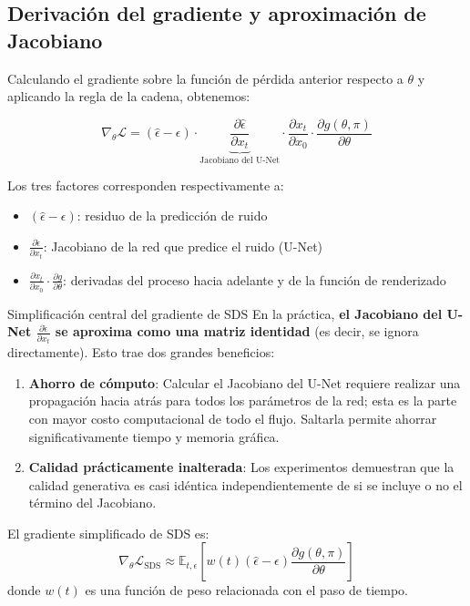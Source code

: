 \subsection{Derivación del gradiente y aproximación de Jacobiano}

Calculando el gradiente sobre la función de pérdida anterior respecto a $\theta$ y aplicando la regla de la cadena, obtenemos:

$$
\nabla_\theta \mathcal{L} = (\hat{\epsilon} - \epsilon) \cdot \underbrace{\frac{\partial \hat{\epsilon}}{\partial x_t}}_{\text{Jacobiano del U-Net}} \cdot \frac{\partial x_t}{\partial x_0} \cdot \frac{\partial g(\theta, \pi)}{\partial \theta}
$$

Los tres factores corresponden respectivamente a:
\begin{itemize}
    \item $(\hat{\epsilon} - \epsilon)$: residuo de la predicción de ruido
    \item $\frac{\partial \hat{\epsilon}}{\partial x_t}$: Jacobiano de la red que predice el ruido (U-Net)
    \item $\frac{\partial x_t}{\partial x_0} \cdot \frac{\partial g}{\partial \theta}$: derivadas del proceso hacia adelante y de la función de renderizado
\end{itemize}

\begin{importantbox}{Simplificación central del gradiente de SDS}
En la práctica, \textbf{el Jacobiano del U-Net $\frac{\partial \hat{\epsilon}}{\partial x_t}$ se aproxima como una matriz identidad} (es decir, se ignora directamente). Esto trae dos grandes beneficios:

\begin{enumerate}
    \item \textbf{Ahorro de cómputo}: Calcular el Jacobiano del U-Net requiere realizar una propagación hacia atrás para todos los parámetros de la red; esta es la parte con mayor costo computacional de todo el flujo. Saltarla permite ahorrar significativamente tiempo y memoria gráfica.
    \item \textbf{Calidad prácticamente inalterada}: Los experimentos demuestran que la calidad generativa es casi idéntica independientemente de si se incluye o no el término del Jacobiano.
\end{enumerate}

El gradiente simplificado de SDS es:
$$
\nabla_\theta \mathcal{L}_{\text{SDS}} \approx \mathbb{E}_{t,\epsilon}\left[w(t)(\hat{\epsilon} - \epsilon) \frac{\partial g(\theta, \pi)}{\partial \theta}\right]
$$
donde $w(t)$ es una función de peso relacionada con el paso de tiempo.
\end{importantbox}

